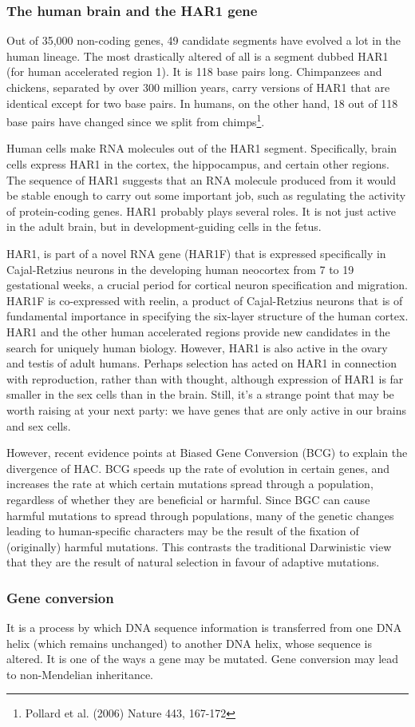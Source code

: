 \subsubsection{The human brain and the HAR1 gene}

Out of 35,000 non-coding genes, 49 candidate segments have evolved a lot in the 
human lineage. The most drastically altered of all is a segment dubbed HAR1 
(for human accelerated region 1). It is 118 base pairs long. Chimpanzees and 
chickens, separated by over 300 million years, carry versions of HAR1 that are 
identical except for two base pairs. In humans, on the other hand, 18 out of 
118 base pairs have changed since we split from chimps\footnote{Pollard et al. 
(2006) Nature 443, 167-172}.

Human cells make RNA molecules out of the HAR1 segment. Specifically, brain 
cells express HAR1 in the cortex, the hippocampus, and certain other regions. 
The sequence of HAR1 suggests that an RNA molecule produced from it would be 
stable enough to carry out some important job, such as regulating the activity 
of protein-coding genes. HAR1 probably plays several roles. It is not just 
active in the adult brain, but in development-guiding cells in the fetus.

HAR1, is part of a novel RNA gene (HAR1F) that is expressed specifically in 
Cajal-Retzius neurons in the developing human neocortex from 7 to 19 
gestational weeks, a crucial period for cortical neuron specification and 
migration. HAR1F is co-expressed with reelin, a product of Cajal-Retzius neurons
that is of fundamental importance in specifying the six-layer structure of the 
human cortex. HAR1 and the other human accelerated regions provide new candidates 
in the search for uniquely human biology. However, HAR1 is also active in the 
ovary and testis of adult humans. Perhaps selection has acted on HAR1 in connection 
with reproduction, rather than with thought, although expression of HAR1 is far 
smaller in the sex cells than in the brain. Still, it's a strange point that may
be worth raising at your next party: we have genes that are only active in our 
brains and sex cells.

However, recent evidence points at Biased Gene Conversion (BCG) to explain the 
divergence of HAC. BCG speeds up the rate of evolution in certain genes, and
increases the rate at which certain mutations spread through a population, 
regardless of whether they are beneficial or harmful. Since BGC can cause 
harmful mutations to spread through populations, many of the genetic changes 
leading to human-specific characters may be the result of the fixation of
(originally) harmful mutations. This contrasts the traditional Darwinistic view
that they are the result of natural selection in favour of adaptive mutations.

\subsubsection{Gene conversion}

It is a process by which DNA sequence information is transferred from one DNA 
helix (which remains unchanged) to another DNA helix, whose sequence is altered.
It is one of the ways a gene may be mutated. Gene conversion may lead to 
non-Mendelian inheritance.
